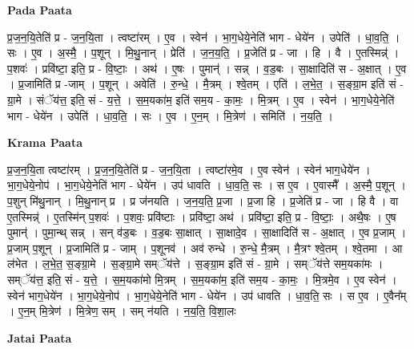 \documentclass[17pt]{extarticle}
\begin{document}
\textbf{Pada Paata} \newline

प्र॒ज॒न॒यि॒तेति॑ प्र - ज॒न॒यि॒ता । त्वष्टा॑रम् । ए॒व । स्वेन॑ । भा॒ग॒धेये॒नेति॑ भाग - धेये॑न । उपेति॑ । धा॒व॒ति॒ । सः । ए॒व । अ॒स्मै॒ । प॒शून् । मि॒थु॒नान् । प्रेति॑ । ज॒न॒य॒ति॒ । प्र॒जेति॑ प्र - जा । हि । वै । ए॒तस्मिन्न्॑ । प॒शवः॑ । प्रवि॑ष्टा॒ इति॒ प्र - वि॒ष्टाः॒ । अथ॑ । ए॒षः । पुमान्॑ । सन्न् । व॒ड॒बः । सा॒क्षादिति॑ स - अ॒क्षात् । ए॒व । प्र॒जामिति॑ प्र -जाम् । प॒शून् । अवेति॑ । रु॒न्धे॒ । मै॒त्रम् । श्वे॒तम् । एति॑ । ल॒भे॒त॒ । स॒ङ्ग्रा॒म इति॑ सं - ग्रा॒मे । संॅय॑त्त॒ इति॒ सं - य॒त्ते॒ । स॒म॒यका॑म॒ इति॑ सम॒य - का॒मः॒ । मि॒त्रम् । ए॒व । स्वेन॑ । भा॒ग॒धेये॒नेति॑ भाग - धेये॑न । उपेति॑ । धा॒व॒ति॒ । सः । ए॒व । ए॒न॒म् । मि॒त्रेण॑ । समिति॑ । न॒य॒ति॒ ।  \newline


\textbf{Krama Paata} \newline

प्र॒ज॒न॒यि॒ता त्वष्टा॑रम् । प्र॒ज॒न॒यि॒तेति॑ प्र - ज॒न॒यि॒ता । त्वष्टा॑रमे॒व । ए॒व स्वेन॑ । स्वेन॑ भाग॒धेये॑न । भा॒ग॒धेये॒नोप॑ । भा॒ग॒धेये॒नेति॑ भाग - धेये॑न । उप॑ धावति । धा॒व॒ति॒ सः । स ए॒व । ए॒वास्मै᳚ । अ॒स्मै॒ प॒शून् । प॒शुन् मि॑थु॒नान् । मि॒थु॒नान् प्र । प्र ज॑नयति । ज॒न॒य॒ति॒ प्र॒जा । प्र॒जा हि । प्र॒जेति॑ प्र - जा । हि वै । वा ए॒तस्मिन्न्॑ । ए॒तस्मि॑न् प॒शवः॑ । प॒शवः॒ प्रवि॑ष्टाः । प्रवि॑ष्टा॒ अथ॑ । प्रवि॑ष्टा॒ इति॒ प्र - वि॒ष्टाः॒ । अथै॒षः । ए॒ष पुमान्॑ । पुमा॒न्थ् सन्न् । सन् व॑ड॒बः । व॒ड॒बः सा॒क्षात् । सा॒क्षादे॒व । सा॒क्षादिति॑ स - अ॒क्षात् । ए॒व प्र॒जाम् । प्र॒जाम् प॒शून् । प्र॒जामिति॑ प्र - जाम् । प॒शूनव॑ । अव॑ रुन्धे । रु॒न्धे॒ मै॒त्रम् । मै॒त्रꣳ श्वे॒तम् । श्वे॒तमा । आ ल॑भेत । ल॒भे॒त॒ स॒ङ्ग्रा॒मे । स॒ङ्ग्रा॒मे सम्ॅय॑त्ते । स॒ङ्ग्रा॒म इति॑ सं - ग्रा॒मे । सम्ॅय॑त्ते सम॒यका॑मः । सम्ॅय॑त्त॒ इति॒ सं - य॒त्ते॒ । स॒म॒यका॑मो मि॒त्रम् । स॒म॒यका॑म॒ इति॑ सम॒य - का॒मः॒ । मि॒त्रमे॒व । ए॒व स्वेन॑ । स्वेन॑ भाग॒धेये॑न । भा॒ग॒धेये॒नोप॑ । भा॒ग॒धेये॒नेति॑ भाग - धेये॑न । उप॑ धावति । धा॒व॒ति॒ सः । स ए॒व । ए॒वैन᳚म् । ए॒न॒म् मि॒त्रेण॑ । मि॒त्रेण॒ सम् । सम् न॑यति । न॒य॒ति॒ वि॒शा॒लः \newline

\textbf{Jatai Paata} \newline
\end{document}
